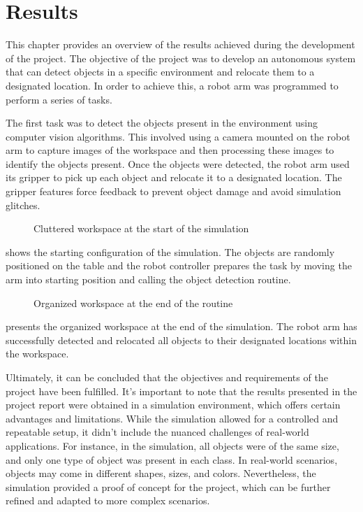 
\chapter{Results} %
\label{results} %



This chapter provides an overview of the results achieved during the development of the project. The objective of the project was to develop an autonomous system that can detect objects in a specific environment and relocate them to a designated location. In order to achieve this, a robot arm was programmed to perform a series of tasks. 

The first task was to detect the objects present in the environment using computer vision algorithms. This involved using a camera mounted on the robot arm to capture images of the workspace and then processing these images to identify the objects present. Once the objects were detected, the robot arm used its gripper to pick up each object and relocate it to a designated location. The gripper features force feedback to prevent object damage and avoid simulation glitches.


\begin{figure}[!h]
    \centering
    \caption{Cluttered workspace at the start of the simulation }
    \label{fig:workspace_start}
\end{figure}

 shows the starting configuration of the simulation. The objects are randomly positioned on the table and the robot controller prepares the task by moving the arm into starting position and calling the object detection routine.

\begin{figure}[!h]
    \centering
    \caption{Organized workspace at the end of the routine }
    \label{fig:workspace_end}
\end{figure}

 presents the organized workspace at the end of the simulation. The robot arm has successfully detected and relocated all objects to their designated locations within the workspace.

Ultimately, it can be concluded that the objectives and requirements of the project have been fulfilled. It's important to note that the results presented in the project report were obtained in a simulation environment, which offers certain advantages and limitations. While the simulation allowed for a controlled and repeatable setup, it didn't include the nuanced challenges of real-world applications. For instance, in the simulation, all objects were of the same size, and only one type of object was present in each class. In real-world scenarios, objects may come in different shapes, sizes, and colors. Nevertheless, the simulation provided a proof of concept for the project, which can be further refined and adapted to more complex scenarios.